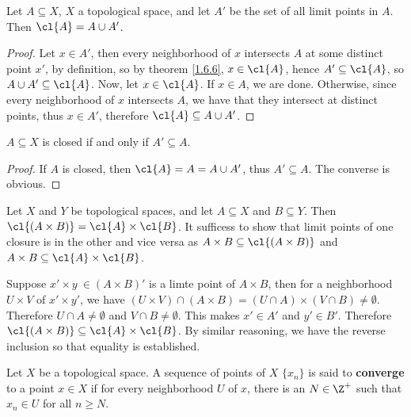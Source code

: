 \begin{theorem}\label{1.6.7}
    Let $A \subseteq X$,  $X$ a topological space, and let  $A'$ be the set of
    all limit points in  $A$. Then  $\cl{A}=A \cup A'$.
\end{theorem}
\begin{proof}
    Let $x \in A'$, then every neighborhood of  $x$ intersects  $A$ at some
    distinct point  $x'$, by definition, so by theorem \ref{1.6.6},  $x \in
    \cl{A}$, hence $A' \subseteq \cl{A}$, so  $A \cup A' \subseteq \cl{A}$.
    Now, let $x \in \cl{A}$. If  $x \in A$, we are done. Otherwise, since every
    neighborhood of  $x$ intersects  $A$, we have that they intersect at
    distinct points, thus  $x \in A'$, therefore $\cl{A} \subseteq A \cup A' $.
\end{proof}
\begin{corollary}
    $A \subseteq X$ is closed if and only if $A' \subseteq A$.
\end{corollary}
\begin{proof}
    If $A$ is closed, then  $\cl{A}=A=A \cup A'$, thus  $A' \subseteq A$. The
    converse is obvious.
\end{proof}

\begin{example}\label{1.15}
    Let $X$ and  $Y$ be topological spaces, and let  $A \subseteq X$ and  $B
    \subseteq Y$. Then  $\cl{(A \times B)}=\cl{A} \times \cl{B}$. It sufficess
    to show that limit points of one closure is in the other and vice versa as
    $A \times B \subseteq \cl{(A \times B)}$ and $A \times B \subseteq \cl{A}
    \times \cl{B}$.

    Suppose $x' \times y\ \in (A \times B)'$ is a limte point of $A \times B$,
    then for a neighborhood  $U \times V$ of  $x' \times y'$, we have  $(U
    \times V) \cap (A \times B)=(U \cap A) \times (V \cap B) \neq \emptyset$.
    Therefore $U \cap A \neq \emptyset$ and $V \cap B \neq \emptyset$. This
    makes $x' \in A'$ and  $y' \in B'$. Therefore  $\cl{(A \times B)} \subseteq
    \cl{A} \times \cl{B}$. By similar reasoning, we have the reverse inclusion
    so that equality is established.
\end{example}

\begin{definition}
    Let $X$ be a topological space. A sequence of points of $X$ $\{x_n\}$ is
    said to \textbf{converge} to a point  $x \in X$ if for every neighborhood
    $U$ of $x$, there is an  $N \in \Z^+$ such that  $x_n \in U$ for all
    $n \geq N$.
\end{definition}

